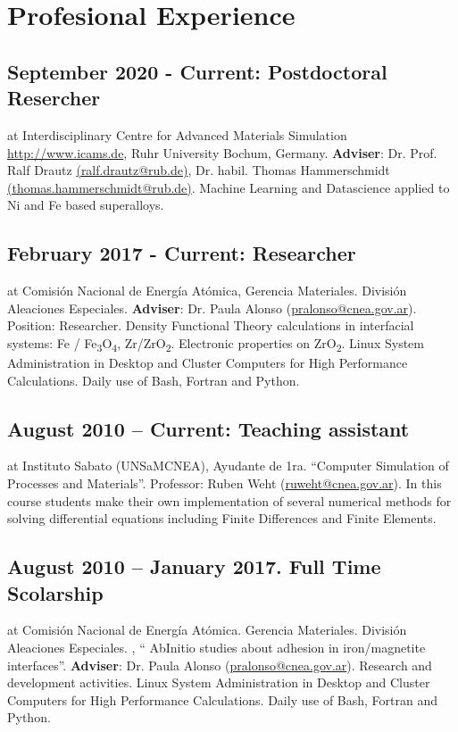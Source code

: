 \section{Profesional Experience}

\subsection{September 2020 - Current: Postdoctoral Resercher} at Interdisciplinary Centre for Advanced Materials Simulation
\href{(ICAMS)}{http://www.icams.de}, Ruhr University Bochum, Germany.
\textbf{Adviser}: Dr. Prof. Ralf Drautz \href{mailto:ralf.drautz@rub.de}{(ralf.drautz@rub.de)}, 
Dr. habil. Thomas Hammerschmidt \href{mailto:thomas.hammerschmidt@rub.de}{(thomas.hammerschmidt@rub.de)}. 
Machine Learning and Datascience applied to Ni and Fe based superalloys. 

\subsection{February 2017 - Current: Researcher} at Comisión Nacional de Energía Atómica,  Gerencia Materiales. División Aleaciones Especiales. \textbf{ Adviser}: Dr. Paula Alonso (\url{pralonso@cnea.gov.ar}). Position: Researcher. Density Functional Theory calculations in interfacial systems: Fe / Fe\textsubscript{3}O\textsubscript{4}, Zr/ZrO\textsubscript{2}. Electronic properties on  ZrO\textsubscript{2}. Linux System Administration in Desktop and Cluster Computers for High Performance Calculations. Daily use of Bash, Fortran and Python.

\subsection{August 2010 – Current: Teaching assistant} at Instituto Sabato (UNSaM\-CNEA), Ayudante de 1ra. “Computer Simulation of Processes and Materials”. Professor: Ruben Weht (\url{ruweht@cnea.gov.ar}). In this course students make their own implementation of several numerical methods for solving differential equations including Finite Differences and Finite Elements.

\subsection{August 2010 – January 2017. Full Time Scolarship} at Comisión Nacional de Energía Atómica. Gerencia Materiales. División Aleaciones Especiales. , “ Ab\-Initio studies about adhesion in iron/magnetite interfaces”. \textbf{Adviser}: Dr. Paula Alonso (\url{pralonso@cnea.gov.ar}). Research and development activities. Linux System Administration in Desktop and Cluster Computers for High Performance Calculations. Daily use of Bash, Fortran and Python. 

